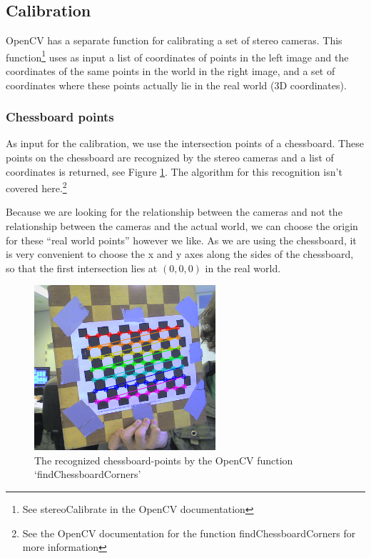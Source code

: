 \documentclass[a4paper]{article}
\begin{document}
\subsection{Calibration}
\label{calib_implement} OpenCV has a separate function for calibrating
a set of stereo cameras. This function\footnote{See stereoCalibrate in
the OpenCV documentation} uses as input a list of coordinates of
points in the left image and the coordinates of the same points in the
world in the right image, and a set of coordinates where these points
actually lie in the real world (3D coordinates).

\subsubsection{Chessboard points} As input for the calibration, we use
the intersection points of a chessboard. These points on the
chessboard are recognized by the stereo cameras and a list of
coordinates is returned, see Figure \ref{chessboardcorners}. The
algorithm for this recognition isn't covered here.\footnote{See the
OpenCV documentation for the function findChessboardCorners for more
information}

Because we are looking for the relationship between the cameras and
not the relationship between the cameras and the actual world, we can
choose the origin for these ``real world points'' however we like. As
we are using the chessboard, it is very convenient to choose the x and
y axes along the sides of the chessboard, so that the first
intersection lies at $(0, 0, 0)$ in the real world.

\begin{figure} [h!tb]
\centering
  \includegraphics[width=0.6\textwidth]{chessboardcorners}
  \caption{The recognized chessboard-points by the OpenCV function
`findChessboardCorners'\label{chessboardcorners}}
\end{figure}
\end{document}
